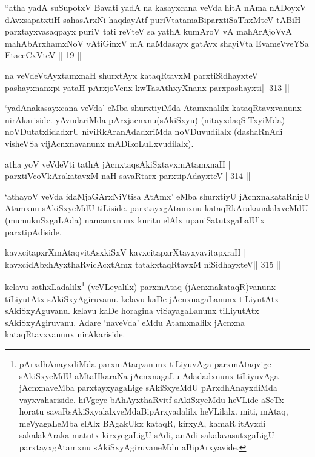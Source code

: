 \begin{shl}
``atha yadA suSupotxV Bavati yadA na kasayxcana veVda
hitA nAma nADoyxV dAvxsapatxtiH sahasArxNi haqdayAtf
puriVtatamaBiparxtiSaThxMteV tABiH parxtayxvasaqpayx puriV
tati reVteV sa yathA kumAroV vA mahArAjoVvA 
mahAbArxhamxNoV vA\s tiGinxV mA naMdasayx gatAvx shayiVta 
EvameVveYSa EtaceCxVteV || 19 ||
\end{shl}


\begin{shl}
na veVdeVtAyxtamxnaH shurxtAyx kataqRtavxM parxtiSidhayxteV |
pashayxnanxpi yataH pArxjoVcnx kwTasAthxyXnanx parxpashayxti\hfill || 313 ||
\end{shl}

\begin{artha}
`yadAnakasayxcana veVda' eMba shurxtiyiMda Atamxnalilx kataqRtavxvanunx  nirAkariside. yAvudariMda pArxjacnxnu(sAkiSxyu) (nitayxdaqSiTxyiMda)  noVDutatxlidadxrU niviRkAranAdadxriMda noVDuvudilalx (dashaRnAdi visheVSa vijAcnxnavanunx mADikoLuLxvudilalx).
\end{artha}


\begin{shl}
\footnotemark[1]atha yoV veVdeVti tathA jAcnxtaqsAkiSxtavxmAtamxnaH |
parxtiVcoV\s kArakatavxM naH savaRtarx parxtipAdayxteV\hfill || 314 ||
\end{shl}

\begin{artha}
`athayoV veVda idaMjaGArxNiVtisa AtAmx' eMba shurxtiyU jAcnxnakataRnigU  Atamxnu sAkiSxyeMdU tiLiside. parxtayxgAtamxnu kataqRkArakanalalxveMdU (mumukuSxgaLAda) namamxnunx kuritu elAlx upaniSatutxgaLalUlx parxtipAdiside.
\end{artha}


\begin{shl}
kavxcitapxrXmAtaqvitAsxkiSxV kavxcitapxrXtayxyavitapxraH |
kavxcidAbxhAyxthaRvicAcx\s\s tAmx tatakxtaqRtavxM niSidhayxteV\hfill || 315 ||
\end{shl}

\begin{artha}
kelavu sathxLadalilx\footnote[2]{pArxdhAnayxdiMda parxmAtaqvanunx  tiLiyuvAga parxmAtaqvige sAkiSxyeMdU aMtaHkaraNa jAcnxnagaLu Adadadxnunx  tiLiyuvAga jAcnxnaveMba parxtayxyagaLige sAkiSxyeMdU pArxdhAnayxdiMda  vayxvahariside. hiVgeye bAhAyxthaRvitf sAkiSxyeMdu heVLide aSeTx horatu  savaRsAkiSxyalalxveMdaBipArxyadalilx heVLilalx. miti, mAtaq, meVyagaLeMba elAlx BAgakUkx kataqR, kirxyA, kamaR itAyxdi sakalakAraka matutx kirxyegaLigU sAdi, anAdi sakalavasutxgaLigU parxtayxgAtamxnu sAkiSxyAgiruvaneMdu aBipArxyavide.} (veVLeyalilx) parxmAtaq (jAcnxnakataqR)vanunx tiLiyutAtx sAkiSxyAgiruvanu. kelavu kaDe jAcnxnagaLanunx tiLiyutAtx sAkiSxyAguvanu. kelavu kaDe horagina viSayagaLanunx tiLiyutAtx sAkiSxyAgiruvanu. Adare `naveVda' eMdu Atamxnalilx jAcnxna kataqRtavxvanunx nirAkariside.
\end{artha}

